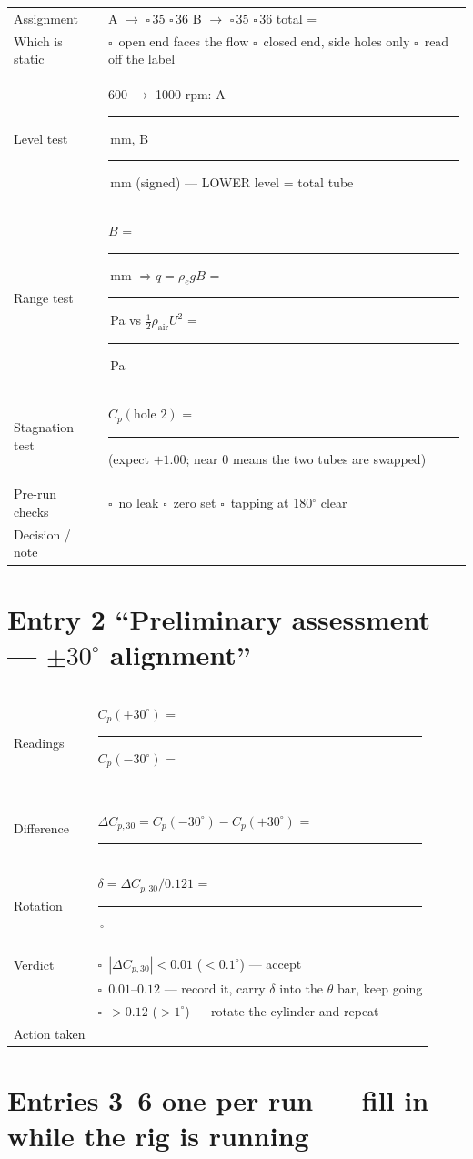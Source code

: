 \documentclass[10pt,a4paper]{article}
\newcommand{\bl}[1]{\rule{#1}{0.4pt}}
\newcommand{\bS}{\bl{1.1cm}}
\newcommand{\bM}{\bl{1.6cm}}
\newcommand{\ck}{\ensuremath{\square}}
\newcommand{\Cp}{\ensuremath{C_p}}
\newcommand{\DCP}{\ensuremath{\Delta C_{p,30}}}
\begin{document}
\vspace{2pt}
\begin{tabularx}{\textwidth}{@{}p{3.9cm}X@{}}
\toprule
Assignment & A $\rightarrow$ \ck\,35 \quad \ck\,36 \qquad B $\rightarrow$ \ck\,35 \quad \ck\,36 \qquad total = \hrulefill \\
Which is static & \ck\ open end faces the flow \quad \ck\ closed end, side holes only \quad \ck\ read off the label \\
Level test & 600 $\rightarrow$ 1000 rpm: A \bS\,mm, B \bS\,mm (signed) --- LOWER level = total tube \\
Range test & $B$ = \bS\,mm $\Rightarrow q=\rho_e gB$ = \bS\,Pa \quad vs \quad $\tfrac12\rho_{\text{air}}U^2$ = \bS\,Pa \\
Stagnation test & $\Cp(\text{hole }2)$ = \bS \quad (expect $+1.00$; near $0$ means the two tubes are swapped) \\
Pre-run checks & \ck\ no leak \quad \ck\ zero set \quad \ck\ tapping at 180$^\circ$ clear \\
Decision / note & \hrulefill \\
\bottomrule
\end{tabularx}

\section*{Entry 2 \hfill \normalsize ``Preliminary assessment --- $\pm30^\circ$ alignment''}

\begin{tabularx}{\textwidth}{@{}lX@{}}
\toprule
Readings & $\Cp(+30^\circ)$ = \bM \qquad $\Cp(-30^\circ)$ = \bM \\
Difference & $\DCP=\Cp(-30^\circ)-\Cp(+30^\circ)$ = \bM \\
Rotation & $\delta=\DCP/0.121$ = \bS\,$^\circ$ \\
Verdict & \ck\ $|\DCP|<0.01$ ($<0.1^\circ$) --- accept \\
        & \ck\ $0.01$--$0.12$ --- record it, carry $\delta$ into the $\theta$ bar, keep going \\
        & \ck\ $>0.12$ ($>1^\circ$) --- rotate the cylinder and repeat \\
Action taken & \hrulefill \\
\bottomrule
\end{tabularx}

\clearpage
\section*{Entries 3--6 \hfill \normalsize one per run --- fill in while the rig is running}
\end{document}
